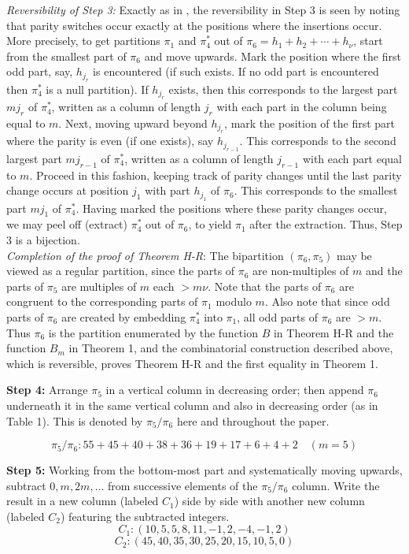\documentclass[12pt,a4paper]{amsart}
\theoremstyle{definition}
\theoremstyle{notation}
\theoremstyle{corollary}
\begin{document}
{\it{Reversibility of Step 3:}} Exactly as in \cite{KAGEABG95}, the reversibility in Step 3 is seen by noting that parity switches occur exactly at the positions where the insertions occur. More precisely, to get partitions $\pi_1$ and $\pi^*_4$ out of $\pi_6=h_1+h_2+\cdots+h_{\nu}$, start from the smallest part of $\pi_6$ and move upwards. Mark the position where the first odd part, say, $h_{j_r}$ is
encountered (if such exists. If no odd part is encountered then $\pi^*_4$ is a null partition). If $h_{j_r}$ exists,  then this corresponds to the largest part $mj_r$ of $\pi^*_4$, written as a column of length $j_r$ with each part in the column being equal to $m$. Next, moving upward beyond $h_{j_r}$, mark the position of the first part where the parity is even (if one exists), say $h_{j_{r-1}}$. This corresponds to the second largest part $mj_{r-1}$ of $\pi^*_4$, written as a column of length $j_{r-1}$ with each part equal to $m$. Proceed in this fashion, keeping track of parity changes until the last parity change occurs at position $j_1$ with part $h_{j_1}$ of $\pi_6$. This corresponds to the smallest part $mj_1$ of $\pi^*_4$. Having marked the positions where these parity changes occur, we may peel off (extract) $\pi^*_4$ out of $\pi_6$, to yield $\pi_1$ after the extraction. Thus, Step 3 is a bijection.\\

\textit{Completion of the proof of Theorem H-R}: The bipartition $(\pi_6, \pi_5)$ may be viewed as a regular partition, since the parts of $\pi_6$ are non-multiples of $m$ and the parts of $\pi_5$ are
multiples of $m$ each $>m\nu$. Note that the parts of $\pi_6$ are congruent to the corresponding parts of
$\pi_1$ modulo $m$. Also note that since odd parts of $\pi_6$ are created by embedding
$\pi^*_4$ into $\pi_1$, all odd parts of $\pi_6$ are $>m$. Thus $\pi_6$ is the partition enumerated by the function $B$ in Theorem H-R and the function $B_m$ in Theorem 1, and the combinatorial construction described above, which is reversible, proves  Theorem H-R and the first equality in Theorem 1.

\medskip

\textbf{Step 4:} Arrange $\pi_5$ in a vertical column in decreasing order; then append $\pi_6$ underneath it in the same vertical column and also in decreasing order (as in Table 1). This is denoted by $\pi_5/\pi_6$ here and throughout the paper.

$$
\pi_5/\pi_6: 55+45+40+38+36+19+17+6+4+2 \quad (m=5)
$$
\medskip


\textbf{Step 5:} Working from the bottom-most part and systematically moving upwards, subtract $0,m,2m, \dots$ from successive elements of the $\pi_5/\pi_6$ column. Write the result in a new column (labeled $C_1$) side by side with another new column (labeled $C_2$) featuring the subtracted integers.
$$
C_1: (10, 5,5, 8, 11, -1, 2, -4, -1, 2)
$$
$$
C_2: (45, 40, 35, 30, 25, 20, 15, 10, 5, 0)
$$
\end{document}
